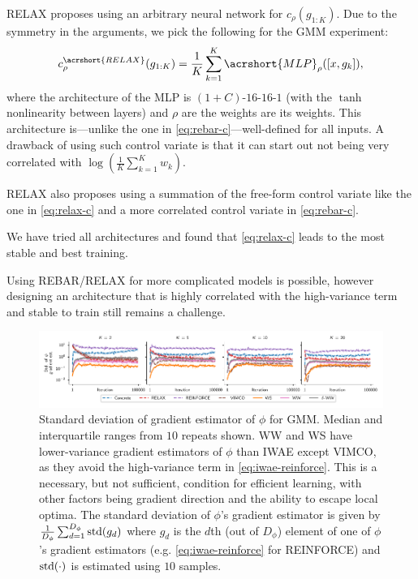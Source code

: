 \Acrshort{RELAX} proposes using an arbitrary neural network for $c_\rho(g_{1:K})$.
Due to the symmetry in the arguments, we pick the following for the \gls{GMM} experiment:
\begin{align}
    c_\rho^{\acrshort{RELAX}}(g_{1:K}) = \frac{1}{K} \sum_{k = 1}^K \acrshort{MLP}_\rho([x, g_k]), \label{eq:relax-c}
\end{align}
where the architecture of the \gls{MLP} is $(1 + C)$-$16$-$16$-$1$ (with the $\tanh$ nonlinearity between layers) and $\rho$ are the weights are its weights.
This architecture is---unlike the one in \cref{eq:rebar-c}---well-defined for all inputs.
A drawback of using such control variate is that it can start out not being very correlated with $\log(\frac{1}{K} \sum_{k = 1}^K w_k)$.

\Acrshort{RELAX} also proposes using a summation of the free-form control variate like the one in \cref{eq:relax-c} and a more correlated control variate in \cref{eq:rebar-c}.

We have tried all architectures and found that \cref{eq:relax-c} leads to the most stable and best training.

Using \acrshort{REBAR}/\acrshort{RELAX} for more complicated models is possible, however designing an architecture that is highly correlated with the high-variance term and stable to train still remains a challenge.

\begin{figure}[!htb]
  \centering
  \includegraphics[width=\textwidth]{figures/RRWS/gmm/errors_just_std.pdf}
  \caption{
    Standard deviation of gradient estimator of $\phi$ for \gls{GMM}.
    Median and interquartile ranges from $10$ repeats shown.
    \Gls{WW} and \gls{WS} have lower-variance gradient estimators of $\phi$ than \gls{IWAE} except \gls{VIMCO}, as they avoid the high-variance term  in \eqref{eq:iwae-reinforce}.
    This is a necessary, but not sufficient, condition for efficient learning, with other factors being gradient direction and the ability to escape local optima.
    The standard deviation of $\phi$'s gradient estimator is given by $\frac{1}{D_\phi} \sum_{d = 1}^{D_\phi} \operatorname{\mathrm{std}}(g_d)$ where $g_d$ is the $d$th (out of $D_\phi$) element of one of $\phi$'s gradient estimators (e.g. \cref{eq:iwae-reinforce} for \acrshort{REINFORCE}) and $\operatorname{\mathrm{std}}(\cdot)$ is estimated using $10$ samples.
  }
  \label{fig:gmm_just_std}
\end{figure}

